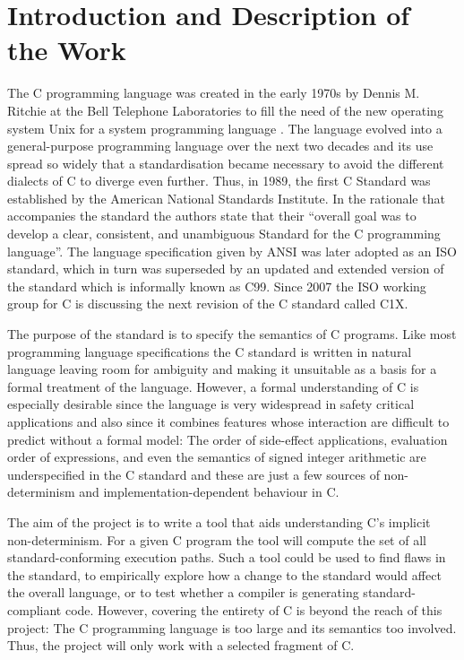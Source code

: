 \documentclass[12pt,a4paper,titlepage]{article}
\begin{document}
\section*{Introduction and Description of the Work}
The C programming language was created in the early 1970s by Dennis M. Ritchie at the Bell Telephone Laboratories to fill the need of the new operating system Unix for a system programming language \cite{developmentOfC}. The language evolved into a general-purpose programming language over the next two decades and its use spread so widely that a standardisation became necessary to avoid the different dialects of C to diverge even further. Thus, in 1989, the first C Standard was established by the American National Standards Institute. In the rationale that accompanies the standard the authors state that their \textquotedblleft overall goal was to develop a clear, consistent, and unambiguous Standard for the C programming language\textquotedblright \cite{ansiC}. The language specification given by ANSI was later adopted as an ISO standard, which in turn was superseded by an updated and extended version of the standard which is informally known as C99. Since 2007 the ISO working group for C is discussing the next revision of the C standard called C1X.

The purpose of the standard is to specify the semantics of C programs. Like most programming language specifications the C standard is written in natural language leaving room for ambiguity and making it unsuitable as a basis for a formal treatment of the language. However, a formal understanding of C is especially desirable since the language is very widespread in safety critical applications and also since it combines features whose interaction are difficult to predict without a formal model: The order of side-effect applications, evaluation order of expressions, and even the semantics of signed integer arithmetic are underspecified in the C standard and these are just a few sources of non-determinism and implementation-dependent behaviour in C.

The aim of the project is to write a tool that aids understanding C's implicit non-determinism. For a given C program the tool will compute the set of all standard-conforming execution paths. Such a tool could be used to find flaws in the standard, to empirically explore how a change to the standard would affect the overall language, or to test whether a compiler is generating standard-compliant code. However, covering the entirety of C is beyond the reach of this project: The C programming language is too large and its semantics too involved. Thus, the project will only work with a selected fragment of C.
\end{document}
